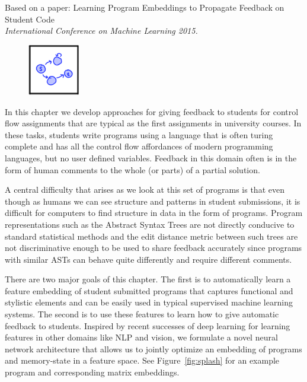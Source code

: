 Based on a paper: Learning Program Embeddings to Propagate Feedback on Student Code \cite{piechICML15} \\ \emph{International Conference on Machine Learning 2015.}

\vspace{7mm}

\begin{figure}[h!]
\includegraphics[width=0.2\textwidth]{img/assnType_3}
\end{figure}

\vspace{7mm}


In this chapter we develop approaches for giving feedback to students for control flow assignments that are typical as the first assignments in university courses. In these tasks, students write programs using a language that is often turing complete and has all the control flow affordances of modern programming languages, but no user defined variables. Feedback in this domain often is in the form of human comments to the whole (or parts) of a partial solution. 

A central difficulty that arises as we look at this set of programs is that even though as humans we can see structure and patterns in student submissions, it is difficult for computers to find structure in data in the form of programs.  Program representations
such as the Abstract Syntax Trees are not directly conducive to standard statistical methods and the edit distance metric between such trees 
are not discriminative enough to be used to share feedback accurately since programs with similar ASTs can behave quite differently and require different comments. 

There are two major goals of this chapter.  The 
first is to automatically learn a feature embedding of 
student submitted programs
that captures functional and stylistic elements and can be easily
used in typical supervised machine learning systems.
The second is to use these features to learn
how to give automatic feedback to students. Inspired by recent successes of deep learning for learning features 
in other domains like NLP and vision, 
we formulate a novel neural network architecture 
that allows us to jointly optimize an embedding of programs and memory-state in a feature space.
See Figure~\ref{fig:splash} for an example program and corresponding matrix embeddings.


